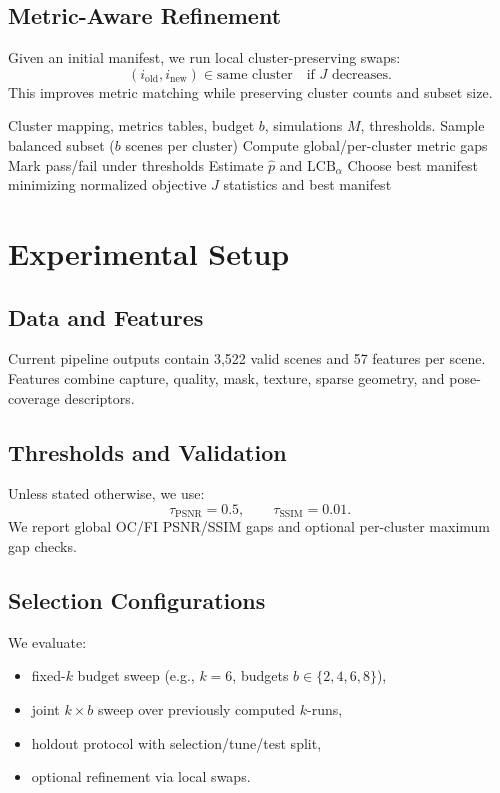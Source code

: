 \documentclass[10pt,twocolumn,letterpaper]{article}
\newcommand{\method}{\textsc{BASS}}
\begin{document}
\subsection{Metric-Aware Refinement}
Given an initial manifest, we run local cluster-preserving swaps:
\begin{equation}
(i_{\text{old}},i_{\text{new}})\in\text{same cluster} \quad \text{if } J \text{ decreases}.
\end{equation}
This improves metric matching while preserving cluster counts and subset size.

\begin{algorithm}[t]
\caption{\method: Risk-Aware Budget Selection (per \((k,b)\))}
\label{alg:bass}
\begin{algorithmic}[1]
\REQUIRE Cluster mapping, metrics tables, budget \(b\), simulations \(M\), thresholds.
  \STATE Sample balanced subset (\(b\) scenes per cluster)
  \STATE Compute global/per-cluster metric gaps
  \STATE Mark pass/fail under thresholds
\ENDFOR
\STATE Estimate \(\hat p\) and \(\mathrm{LCB}_{\alpha}\)
\STATE Choose best manifest minimizing normalized objective \(J\)
\RETURN statistics and best manifest
\end{algorithmic}
\end{algorithm}

\section{Experimental Setup}
\label{sec:exp}

\subsection{Data and Features}
Current pipeline outputs contain 3,522 valid scenes and 57 features per scene. Features combine capture, quality, mask, texture, sparse geometry, and pose-coverage descriptors.

\subsection{Thresholds and Validation}
Unless stated otherwise, we use:
\begin{equation}
\tau_{\text{PSNR}}=0.5,\qquad \tau_{\text{SSIM}}=0.01.
\end{equation}
We report global OC/FI PSNR/SSIM gaps and optional per-cluster maximum gap checks.

\subsection{Selection Configurations}
We evaluate:
\begin{itemize}[leftmargin=*,nosep]
\item fixed-\(k\) budget sweep (e.g., \(k=6\), budgets \(b\in\{2,4,6,8\}\)),
\item joint \(k\times b\) sweep over previously computed \(k\)-runs,
\item holdout protocol with selection/tune/test split,
\item optional refinement via local swaps.
\end{itemize}
\end{document}
